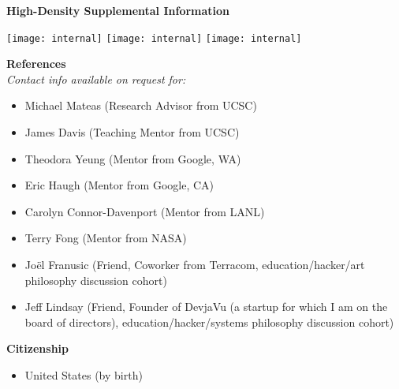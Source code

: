 \documentclass[10pt]{article}
\begin{document}
\newpage
{\large \textbf{High-Density Supplemental Information}}

\begin{minipage}{\textwidth}
\texttt{[image: internal]}
\texttt{[image: internal]}
\texttt{[image: internal]}
\end{minipage}


{\large \textbf{References}}\\

\textit{Contact info available on request for:}\\
\begin{itemize}
  \item Michael Mateas (Research Advisor from UCSC)
  \item James Davis (Teaching Mentor from UCSC)
  \item Theodora Yeung (Mentor from Google, WA)
  \item Eric Haugh (Mentor from Google, CA)
  \item Carolyn Connor-Davenport (Mentor from LANL)
  \item Terry Fong (Mentor from NASA)
  \item Jo\"{e}l Franusic (Friend, Coworker from Terracom, education/hacker/art philosophy discussion cohort)
  \item Jeff Lindsay (Friend, Founder of DevjaVu (a startup for which I am on the board of directors), education/hacker/systems philosophy discussion cohort)
\end{itemize}

{\large \textbf{Citizenship}}
\begin{itemize}
  \item United States (by birth)
\end{itemize}


\vspace{0.25in}
\end{document}
